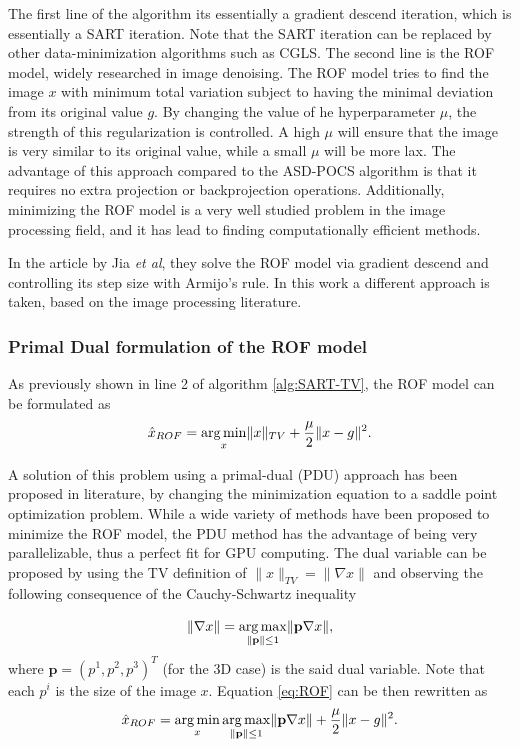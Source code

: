 The first line of the algorithm its essentially a gradient descend iteration, which is essentially a SART iteration. Note that the SART iteration can be replaced by other data-minimization algorithms such as CGLS. The second line is the ROF model, widely researched in image denoising. The ROF model tries to find the image $x$ with minimum total variation subject to having the minimal deviation from its original value $g$. By changing the value of he hyperparameter $\mu$, the strength of this regularization is controlled. A high $\mu$ will ensure that the image is very similar to its original value, while a small $\mu$ will be more lax. The advantage of this approach compared to the ASD-POCS algorithm is that it requires no extra projection or backprojection operations. Additionally, minimizing the ROF model is a very well studied problem in the image processing field, and it has lead to finding computationally efficient methods.

 In the article by Jia \emph{et al}, they solve the ROF model via gradient descend and controlling its step size with Armijo's rule. In this work a different approach is taken, based on the image processing literature.
 
 \subsubsection{Primal Dual formulation of the ROF model}
 
As previously shown in line 2 of algorithm \ref{alg:SART-TV}, the ROF model can be formulated as 
\begin{equation}
\hat{x}_{ROF}=\mathop{\mathrm{arg\,min}}_x  \lVert x\rVert_{TV}+\frac{\mu}{2} \lVert x-g \rVert^2.\label{eq:ROF}
\end{equation}

A solution of this problem using a primal-dual (PDU) approach has been proposed in literature\cite{zhu2008efficient}, by changing the minimization equation to a saddle point optimization problem. While a wide variety of methods have been proposed to minimize the ROF model\cite{RUDIN}\cite{vogel1996iterative}\cite{chambolle2004algorithm}, the PDU method has the advantage of being very parallelizable, thus a perfect fit for GPU computing. The dual variable can be proposed by using the TV definition of $\lVert x\rVert_{TV}=\lVert \nabla x \rVert$ and observing the following consequence of the Cauchy-Schwartz inequality

\begin{equation}
\lVert \nabla x \rVert=\mathop{\mathrm{arg\,max}}_{\lVert\textbf{p}\rVert\leq 1} \lVert\textbf{p}\nabla x\rVert,
\end{equation}
where $\textbf{p}=(p^1,p^2,p^3)^T$ (for the 3D case) is the said dual variable. Note that each $p^i$ is the size of the image $x$. Equation \ref{eq:ROF} can be then rewritten as
\begin{equation}
\hat{x}_{ROF}=\mathop{\mathrm{arg\,min}}_x \mathop{\mathrm{arg\,max}}_{\lVert\textbf{p}\rVert\leq 1}\lVert\textbf{p}\nabla x\rVert + \frac{\mu}{2} \lVert x-g \rVert^2.\label{eq:PUD}
\end{equation}

